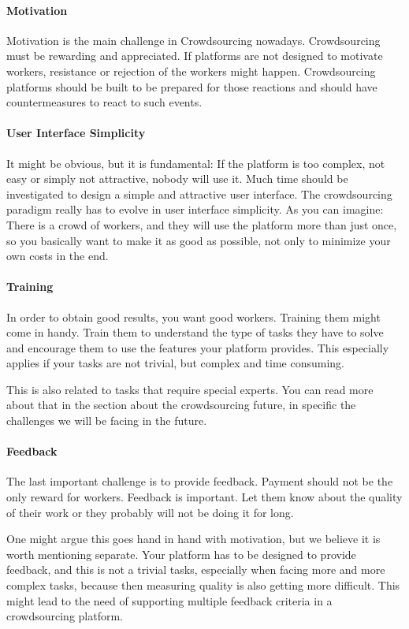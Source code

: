 \documentclass{sig-alternate}
\begin{document}
\paragraph{Motivation}
Motivation is the main challenge in Crowdsourcing nowadays. Crowdsourcing must be rewarding and appreciated. If platforms
are not designed to motivate workers, resistance or rejection of the workers might happen. Crowdsourcing platforms should be built to be prepared
for those reactions and should have countermeasures to react to such events. 

\paragraph{User Interface Simplicity}
It might be obvious, but it is fundamental: If the platform is too complex, not easy or simply not attractive, nobody will use it.
Much time should be investigated to design a simple and attractive user interface.
The crowdsourcing paradigm really has to evolve in user interface simplicity. As you can imagine: There is a crowd of workers, and they
will use the platform more than just once, so you basically want to make it as good as possible, not only to minimize your own costs in the end.

\paragraph{Training}
In order to obtain good results, you want good workers. Training them might come in handy. Train them to understand the type of 
tasks they have to solve and encourage them to use the features your platform provides. This especially applies if your tasks are not
trivial, but complex and time consuming.

This is also related to tasks that require special experts. You can read more about that in the section about the crowdsourcing future, in specific the challenges we 
will be facing in the future.

\paragraph{Feedback}
The last important challenge is to provide feedback. Payment should not be the only reward for workers. Feedback is important.
Let them know about the quality of their work or they probably will not be doing it for long.

One might argue this goes hand in hand with motivation, but we believe it is worth mentioning separate. Your platform has to be designed to provide feedback, 
and this is not a trivial tasks, especially when facing more and more complex tasks, because then measuring quality is also getting more difficult. 
This might lead to the need of supporting multiple feedback criteria in a crowdsourcing platform.
\end{document}
